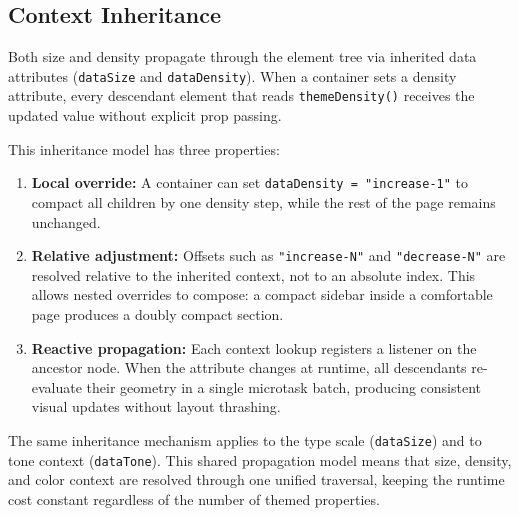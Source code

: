 \subsection{Context Inheritance}
\label{sec:context-inheritance}

Both size and density propagate through the element tree via inherited data attributes (\texttt{dataSize} and \texttt{dataDensity}). When a container sets a density attribute, every descendant element that reads \texttt{themeDensity()} receives the updated value without explicit prop passing.

This inheritance model has three properties:

\begin{enumerate}
  \item \textbf{Local override:} A container can set \texttt{dataDensity = "increase-1"} to compact all children by one density step, while the rest of the page remains unchanged.

  \item \textbf{Relative adjustment:} Offsets such as \texttt{"increase-N"} and \texttt{"decrease-N"} are resolved relative to the inherited context, not to an absolute index. This allows nested overrides to compose: a compact sidebar inside a comfortable page produces a doubly compact section.

  \item \textbf{Reactive propagation:} Each context lookup registers a listener on the ancestor node. When the attribute changes at runtime, all descendants re-evaluate their geometry in a single microtask batch, producing consistent visual updates without layout thrashing.
\end{enumerate}

The same inheritance mechanism applies to the type scale (\texttt{dataSize}) and to tone context (\texttt{dataTone}). This shared propagation model means that size, density, and color context are resolved through one unified traversal, keeping the runtime cost constant regardless of the number of themed properties.
